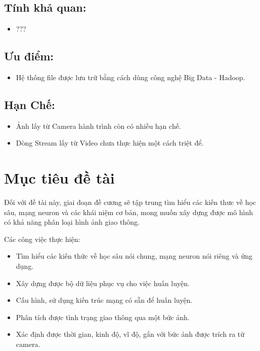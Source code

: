 \subsection{Tính khả quan:}
\begin{itemize}
\item ???
\end{itemize}
\subsection{Ưu điểm:}
\begin{itemize}
\item Hệ thống file được lưu trữ bằng cách dùng công nghệ Big Data - Hadoop.
\end{itemize}
\subsection{Hạn Chế:}
\begin{itemize}
\item Ảnh lấy từ Camera hành trình còn có nhiều hạn chế.
\item Dòng Stream lấy từ Video chưa thực hiện một cách triệt để.
\end{itemize}
\section{Mục tiêu đề tài}
Đối với đề tài này, giai đoạn đề cương sẽ tập trung tìm hiểu các kiến thưc về học sâu, mạng neuron và các khái niệm cơ bản, mong muốn xây dựng được mô hình có khả năng phân loại hình ảnh giao thông.\par
Các công việc thực hiện:
\begin{itemize}
	\item Tìm hiểu các kiến thức về học sâu nói chung, mạng neuron nói riêng và ứng dụng.
	\item Xây dựng được bộ dữ liệu phục vụ cho việc huấn luyện.
	\item Cấu hình, sử dụng kiến trúc mạng có sẵn để huấn luyện.
	\item Phân tích được tình trạng giao thông qua một bức ảnh.
	\item Xác định được thời gian, kinh độ, vĩ độ, gắn với bức ảnh được trích ra từ camera.	
\end{itemize}